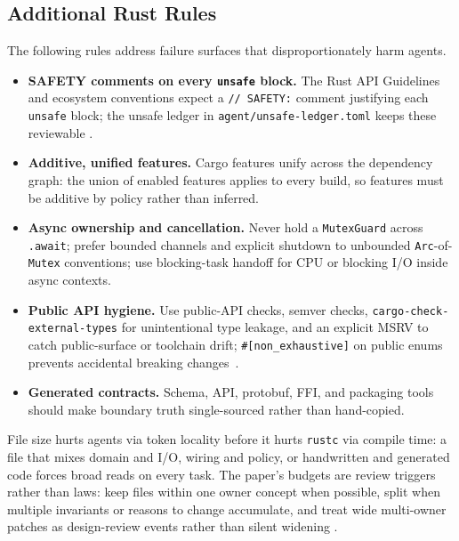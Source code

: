 \documentclass[conference]{IEEEtran}
\begin{document}
\subsection{Additional Rust Rules}
The following rules address failure surfaces that disproportionately harm agents.

\begin{itemize}
  \item \textbf{SAFETY comments on every \texttt{unsafe} block.} The Rust API Guidelines and ecosystem conventions expect a \texttt{// SAFETY:} comment justifying each \texttt{unsafe} block; the unsafe ledger in \texttt{agent/unsafe-ledger.toml} keeps these reviewable \cite{rustApiGuidelines2026,rustonomicon2026}.
  \item \textbf{Additive, unified features.} Cargo features unify across the dependency graph: the union of enabled features applies to every build, so features must be additive by policy rather than inferred.
  \item \textbf{Async ownership and cancellation.} Never hold a \texttt{MutexGuard} across \texttt{.await}; prefer bounded channels and explicit shutdown to unbounded \texttt{Arc}-of-\texttt{Mutex} conventions; use blocking-task handoff for CPU or blocking I/O inside async contexts.
  \item \textbf{Public API hygiene.} Use public-API checks, semver checks, \texttt{cargo-check-external-types} for unintentional type leakage, and an explicit MSRV to catch public-surface or toolchain drift; \texttt{\#[non\_exhaustive]} on public enums prevents accidental breaking changes~\cite{cargoCheckExternalTypes2026}.
  \item \textbf{Generated contracts.} Schema, API, protobuf, FFI, and packaging tools should make boundary truth single-sourced rather than hand-copied.
\end{itemize}

File size hurts agents via token locality before it hurts \texttt{rustc} via compile time: a file that mixes domain and I/O, wiring and policy, or handwritten and generated code forces broad reads on every task. The paper's budgets are review triggers rather than laws: keep files within one owner concept when possible, split when multiple invariants or reasons to change accumulate, and treat wide multi-owner patches as design-review events rather than silent widening \cite{buseWeimer2008,mccabe1976,cognitiveComplexity2021,googleSmallCls2026}.
\end{document}

